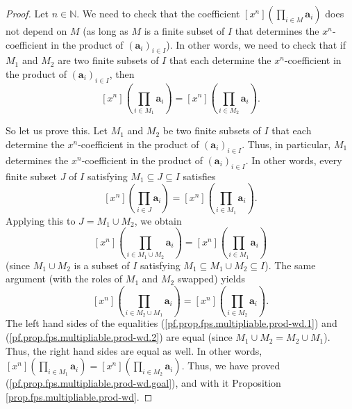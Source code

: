 \begin{proof}
Let $n\in\mathbb{N}$. We need to check that the coefficient $\left[
x^{n}\right]  \left(  \prod_{i\in M}\mathbf{a}_{i}\right)  $ does not depend
on $M$ (as long as $M$ is a finite subset of $I$ that determines the $x^{n}%
$-coefficient in the product of $\left(  \mathbf{a}_{i}\right)  _{i\in I}$).
In other words, we need to check that if $M_{1}$ and $M_{2}$ are two finite
subsets of $I$ that each determine the $x^{n}$-coefficient in the product of
$\left(  \mathbf{a}_{i}\right)  _{i\in I}$, then%
\begin{equation}
\left[  x^{n}\right]  \left(  \prod_{i\in M_{1}}\mathbf{a}_{i}\right)
=\left[  x^{n}\right]  \left(  \prod_{i\in M_{2}}\mathbf{a}_{i}\right)  .
\label{pf.prop.fps.multipliable.prod-wd.goal}%
\end{equation}


So let us prove this. Let $M_{1}$ and $M_{2}$ be two finite subsets of $I$
that each determine the $x^{n}$-coefficient in the product of $\left(
\mathbf{a}_{i}\right)  _{i\in I}$. Thus, in particular, $M_{1}$ determines the
$x^{n}$-coefficient in the product of $\left(  \mathbf{a}_{i}\right)  _{i\in
I}$. In other words, every finite subset $J$ of $I$ satisfying $M_{1}\subseteq
J\subseteq I$ satisfies%
\[
\left[  x^{n}\right]  \left(  \prod_{i\in J}\mathbf{a}_{i}\right)  =\left[
x^{n}\right]  \left(  \prod_{i\in M_{1}}\mathbf{a}_{i}\right)  .
\]
Applying this to $J=M_{1}\cup M_{2}$, we obtain%
\begin{equation}
\left[  x^{n}\right]  \left(  \prod_{i\in M_{1}\cup M_{2}}\mathbf{a}%
_{i}\right)  =\left[  x^{n}\right]  \left(  \prod_{i\in M_{1}}\mathbf{a}%
_{i}\right)  \label{pf.prop.fps.multipliable.prod-wd.1}%
\end{equation}
(since $M_{1}\cup M_{2}$ is a subset of $I$ satisfying $M_{1}\subseteq
M_{1}\cup M_{2}\subseteq I$). The same argument (with the roles of $M_{1}$ and
$M_{2}$ swapped) yields%
\begin{equation}
\left[  x^{n}\right]  \left(  \prod_{i\in M_{2}\cup M_{1}}\mathbf{a}%
_{i}\right)  =\left[  x^{n}\right]  \left(  \prod_{i\in M_{2}}\mathbf{a}%
_{i}\right)  . \label{pf.prop.fps.multipliable.prod-wd.2}%
\end{equation}
The left hand sides of the equalities
(\ref{pf.prop.fps.multipliable.prod-wd.1}) and
(\ref{pf.prop.fps.multipliable.prod-wd.2}) are equal (since $M_{1}\cup
M_{2}=M_{2}\cup M_{1}$). Thus, the right hand sides are equal as well. In
other words, $\left[  x^{n}\right]  \left(  \prod_{i\in M_{1}}\mathbf{a}%
_{i}\right)  =\left[  x^{n}\right]  \left(  \prod_{i\in M_{2}}\mathbf{a}%
_{i}\right)  $. Thus, we have proved
(\ref{pf.prop.fps.multipliable.prod-wd.goal}), and with it Proposition
\ref{prop.fps.multipliable.prod-wd}.
\end{proof}

